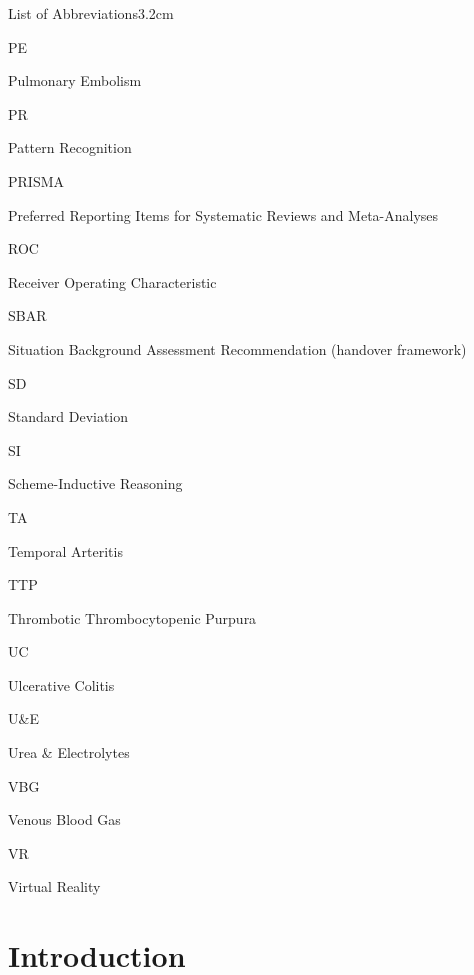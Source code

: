 \documentclass[a4paper, nobind]{templates/ociamthesis}
\begin{document}
\begin{romanpages}
\begin{mclistof}{List of Abbreviations}{3.2cm}
\item[PE]

Pulmonary Embolism

\item[PR]

Pattern Recognition

\item[PRISMA]

Preferred Reporting Items for Systematic Reviews and Meta-Analyses

\item[ROC]

Receiver Operating Characteristic

\item[SBAR]

Situation Background Assessment Recommendation (handover framework)

\item[SD]

Standard Deviation

\item[SI]

Scheme-Inductive Reasoning

\item[TA]

Temporal Arteritis

\item[TTP]

Thrombotic Thrombocytopenic Purpura

\item[UC]

Ulcerative Colitis

\item[U\&E]

Urea \& Electrolytes

\item[VBG]

Venous Blood Gas

\item[VR]

Virtual Reality

\end{mclistof} 


\end{romanpages}

\flushbottom

\chapter{Introduction}\label{chapter-1}
\end{document}
